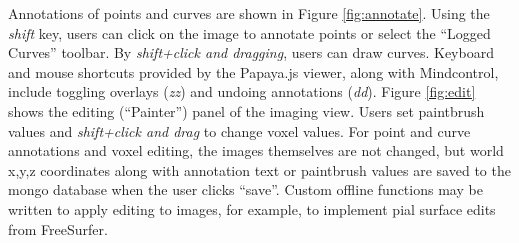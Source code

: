 Annotations of points and curves are shown in Figure \ref{fig:annotate}. Using the \textit{shift} key, users can click on the image to annotate points or select the ``Logged Curves'' toolbar. By \textit{shift+click and dragging}, users can draw curves. Keyboard and mouse shortcuts provided by the Papaya.js viewer, along with Mindcontrol, include toggling overlays (\textit{zz}) and undoing annotations (\textit{dd}). Figure \ref{fig:edit} shows the editing (``Painter'') panel of the imaging view. Users set paintbrush values and \textit{shift+click and drag} to change voxel values. For point and curve annotations and voxel editing, the images themselves are not changed, but world x,y,z coordinates along with annotation text or paintbrush values are saved to the mongo database when the user clicks ``save''. Custom offline functions may be written to apply editing to images, for example, to implement pial surface edits from FreeSurfer. 